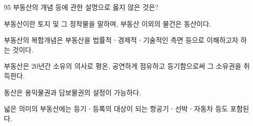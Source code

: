 \begin{question}{95}
부동산의 개념 등에 관한 설명으로 옳지 않은 것은?
\begin{choices}
  \item 부동산이란 토지 및 그 정착물을 말하며, 부동산 이외의 물건은 동산이다.
  \item 부동산의 복합개념은 부동산을 법률적ㆍ경제적ㆍ기술적인 측면 등으로 이해하고자 하는 것이다.
  \item 부동산은 20년간 소유의 의사로 평온, 공연하게 점유하고 등기함으로써 그 소유권을 취득한다.
  \item 동산은 용익물권과 담보물권의 설정이 가능하다.
  \item 넓은 의미의 부동산에는 등기ㆍ등록의 대상이 되는 항공기ㆍ선박ㆍ자동차 등도 포함된다.
\end{choices}
\end{question}
